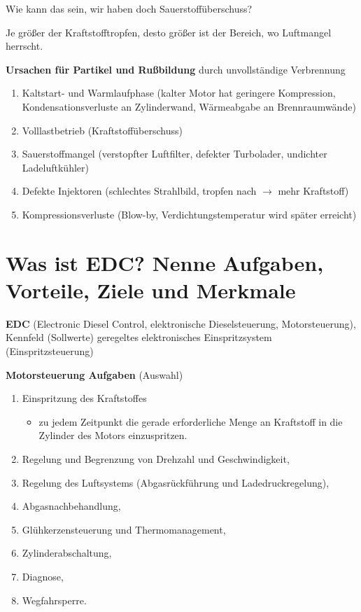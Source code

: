 Wie kann das sein, wir haben doch Sauerstoffüberschuss?

Je größer der Kraftstofftropfen, desto größer ist der Bereich, wo
Luftmangel herrscht.

\textbf{Ursachen für Partikel und Rußbildung} durch unvollständige
Verbrennung

\begin{enumerate}
\item
  Kaltstart- und Warmlaufphase (kalter Motor hat geringere Kompression,
  Kondensationsverluste an Zylinderwand, Wärmeabgabe an Brennraumwände)
\item
  Volllastbetrieb (Kraftstoffüberschuss)
\item
  Sauerstoffmangel (verstopfter Luftfilter, defekter Turbolader,
  undichter Ladeluftkühler)
\item
  Defekte Injektoren (schlechtes Strahlbild, tropfen nach $\to$ mehr
  Kraftstoff)
\item
  Kompressionsverluste (Blow-by, Verdichtungstemperatur wird später
  erreicht)
\end{enumerate}

\section{Was ist EDC? Nenne Aufgaben, Vorteile, Ziele und
Merkmale}\label{was-ist-edc-nenne-aufgaben-vorteile-ziele-und-merkmale}

\textbf{EDC} (Electronic Diesel Control, elektronische Dieselsteuerung,
Motorsteuerung), Kennfeld (Sollwerte) geregeltes elektronisches
Einspritzsystem (Einspritzsteuerung)

\textbf{Motorsteuerung Aufgaben} (Auswahl)

\begin{enumerate}
\item
  Einspritzung des Kraftstoffes

  \begin{itemize}
  \item
    zu jedem Zeitpunkt die gerade erforderliche Menge an Kraftstoff in
    die Zylinder des Motors einzuspritzen.
  \end{itemize}
\item
  Regelung und Begrenzung von Drehzahl und Geschwindigkeit,
\item
  Regelung des Luftsystems (Abgasrückführung und Ladedruckregelung),
\item
  Abgasnachbehandlung,
\item
  Glühkerzensteuerung und Thermomanagement,
\item
  Zylinderabschaltung,
\item
  Diagnose,
\item
  Wegfahrsperre.
\end{enumerate}

